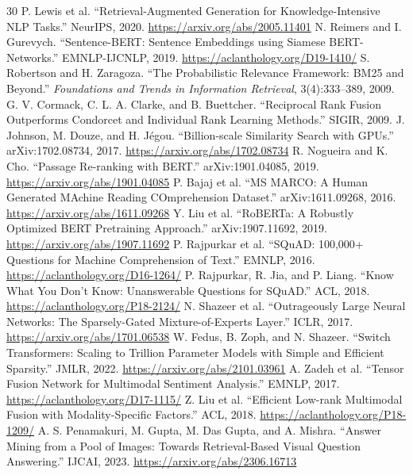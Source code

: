 \documentclass[10pt,a4paper]{article}
\begin{document}
\begingroup
\small
\begin{thebibliography}{30}
 P. Lewis et al. ``Retrieval-Augmented Generation for Knowledge-Intensive NLP Tasks.'' NeurIPS, 2020. \url{https://arxiv.org/abs/2005.11401}
 N. Reimers and I. Gurevych. ``Sentence-BERT: Sentence Embeddings using Siamese BERT-Networks.'' EMNLP-IJCNLP, 2019. \url{https://aclanthology.org/D19-1410/}
 S. Robertson and H. Zaragoza. ``The Probabilistic Relevance Framework: BM25 and Beyond.'' \emph{Foundations and Trends in Information Retrieval}, 3(4):333--389, 2009.
 G. V. Cormack, C. L. A. Clarke, and B. Buettcher. ``Reciprocal Rank Fusion Outperforms Condorcet and Individual Rank Learning Methods.'' SIGIR, 2009.
 J. Johnson, M. Douze, and H. J\'egou. ``Billion-scale Similarity Search with GPUs.'' arXiv:1702.08734, 2017. \url{https://arxiv.org/abs/1702.08734}
 R. Nogueira and K. Cho. ``Passage Re-ranking with BERT.'' arXiv:1901.04085, 2019. \url{https://arxiv.org/abs/1901.04085}
 P. Bajaj et al. ``MS MARCO: A Human Generated MAchine Reading COmprehension Dataset.'' arXiv:1611.09268, 2016. \url{https://arxiv.org/abs/1611.09268}
 Y. Liu et al. ``RoBERTa: A Robustly Optimized BERT Pretraining Approach.'' arXiv:1907.11692, 2019. \url{https://arxiv.org/abs/1907.11692}
 P. Rajpurkar et al. ``SQuAD: 100,000+ Questions for Machine Comprehension of Text.'' EMNLP, 2016. \url{https://aclanthology.org/D16-1264/}
 P. Rajpurkar, R. Jia, and P. Liang. ``Know What You Don't Know: Unanswerable Questions for SQuAD.'' ACL, 2018. \url{https://aclanthology.org/P18-2124/}
 N. Shazeer et al. ``Outrageously Large Neural Networks: The Sparsely-Gated Mixture-of-Experts Layer.'' ICLR, 2017. \url{https://arxiv.org/abs/1701.06538}
 W. Fedus, B. Zoph, and N. Shazeer. ``Switch Transformers: Scaling to Trillion Parameter Models with Simple and Efficient Sparsity.'' JMLR, 2022. \url{https://arxiv.org/abs/2101.03961}
 A. Zadeh et al. ``Tensor Fusion Network for Multimodal Sentiment Analysis.'' EMNLP, 2017. \url{https://aclanthology.org/D17-1115/}
 Z. Liu et al. ``Efficient Low-rank Multimodal Fusion with Modality-Specific Factors.'' ACL, 2018. \url{https://aclanthology.org/P18-1209/}
 A. S. Penamakuri, M. Gupta, M. Das Gupta, and A. Mishra. ``Answer Mining from a Pool of Images: Towards Retrieval-Based Visual Question Answering.'' IJCAI, 2023. \url{https://arxiv.org/abs/2306.16713}

\end{thebibliography}
\end{document}
